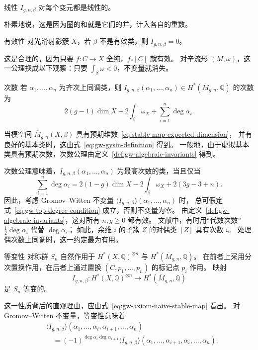 \begin{axiom*}{线性}
$I_{g,n,\beta}$ 对每个变元都是线性的。
\end{axiom*}
朴素地说，这是因为圈的和就是它们的并，计入各自的重数。

\begin{axiom*}{有效性}
对光滑射影簇 $X$，若 $\beta$ 不是有效类，则 $I_{g,n,\beta}=0$。
\end{axiom*}
这是合理的，因为只要 $f:C\to X$ 全纯，$f_*[C]$ 就有效。
对辛流形 $(M,\omega)$，这一公理换成以下观察：只要 $\int_\beta\omega<0$，不变量就消失。

\begin{axiom*}{次数}
若 $\alpha_1,\ldots,\alpha_n$ 为齐次上同调类，则
$I_{g,n,\beta}(\alpha_1,\ldots,\alpha_n)\in H^*(\overline M_{g,n},\mathbb Q)$ 的次数为
\[
2(g-1)\dim X+2\int_\beta\omega_X+\sum_{i=1}^n\deg\alpha_i.
\]
\end{axiom*}
当模空间 $\overline M_{g,n}(X,\beta)$ 具有预期维数~\eqref{eq:stable-map-expected-dimension}，
并有良好的基本类时，这由式~\eqref{eq:gw-gysin-definition} 得到。
一般地，由于虚拟基本类具有预期次数，次数公理由定义~\ref{def:gw-algebraic-invariants} 得到。

次数公理意味着，$I_{g,n,\beta}(\alpha_1,\ldots,\alpha_n)$ 为最高次数的类，当且仅当
\begin{equation}\label{eq:gw-top-degree-condition}
\sum_{i=1}^n\deg\alpha_i
=2(1-g)\dim X-2\int_\beta\omega_X+2(3g-3+n).
\end{equation}
因此，考虑 Gromov--Witten 不变量 $\langle I_{g,n,\beta}\rangle(\alpha_1,\ldots,\alpha_n)$ 时，
总可假定式~\eqref{eq:gw-top-degree-condition} 成立，否则不变量为零。
由定义~\ref{def:gw-algebraic-invariants}，这对所有 $n,g\geq0$ 都有效。
文献中，有时用“代数次数” $\tfrac12\deg\alpha_i$ 代替 $\deg\alpha_i$；
如此，余维 $i$ 的子簇 $Z$ 的对偶类 $[Z]$ 具有次数 $i$。
处理偶次数上同调时，这一约定最为有用。

\begin{axiom*}{等变性}
对称群 $S_n$ 自然作用于 $H^*(X,\mathbb Q)^{\otimes n}$ 与 $H^*(\overline M_{g,n},\mathbb Q)$。
在前者上采用分次置换作用，在后者上通过置换 $(C,p_1,\ldots,p_n)$ 的标记点 $p_i$ 作用。
映射
\[
I_{g,n,\beta}:H^*(X,\mathbb Q)^{\otimes n}
\longrightarrow H^*(\overline M_{g,n},\mathbb Q)
\]
是 $S_n$ 等变的。
\end{axiom*}
这一性质背后的直观理由，应由式~\eqref{eq:gw-axiom-naive-stable-map} 看出。
对 Gromov--Witten 不变量，等变性意味着
\[
\begin{aligned}
&\langle I_{g,n,\beta}\rangle(\alpha_1,\ldots,\alpha_i,\alpha_{i+1},\ldots,\alpha_n)\\
&\quad=(-1)^{\deg\alpha_i\deg\alpha_{i+1}}
\langle I_{g,n,\beta}\rangle(\alpha_1,\ldots,\alpha_{i+1},\alpha_i,\ldots,\alpha_n).
\end{aligned}
\]

